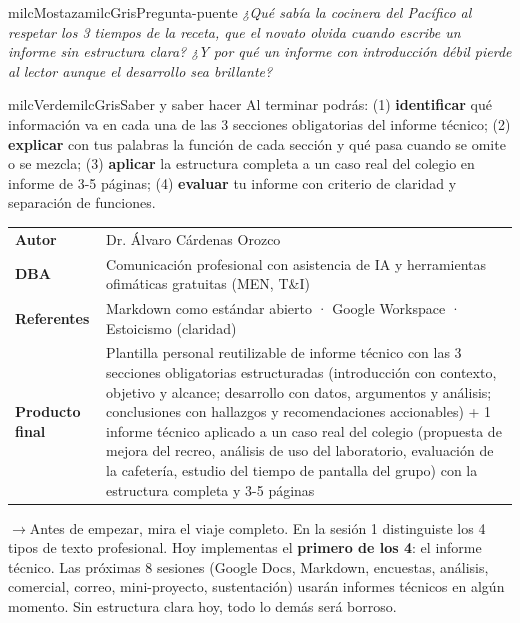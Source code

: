 \documentclass[11pt,letterpaper]{article}
\newcommand{\puente}[1]{%
  \begin{puentebox}%
    \textcolor{milcGradeDark}{$\rightarrow$}\hspace{2mm}#1%
  \end{puentebox}%
}
\begin{document}
\begin{softbox}{milcMostaza}{milcGris}{Pregunta-puente}
\textit{¿Qué sabía la cocinera del Pacífico al respetar los 3 tiempos de la receta, que el novato olvida cuando escribe un informe sin estructura clara? ¿Y por qué un informe con introducción débil pierde al lector aunque el desarrollo sea brillante?}
\end{softbox}

\begin{softbox}{milcVerde}{milcGris}{Saber y saber hacer}
Al terminar podrás: (1) \textbf{identificar} qué información va en cada una de las 3 secciones obligatorias del informe técnico; (2) \textbf{explicar} con tus palabras la función de cada sección y qué pasa cuando se omite o se mezcla; (3) \textbf{aplicar} la estructura completa a un caso real del colegio en informe de 3-5 páginas; (4) \textbf{evaluar} tu informe con criterio de claridad y separación de funciones.
\end{softbox}



\small
\begin{tabularx}{\textwidth}{>{\bfseries}p{3.0cm}Y}
Autor & Dr. Álvaro Cárdenas Orozco\\
DBA & Comunicación profesional con asistencia de IA y herramientas ofimáticas gratuitas (MEN, T\&I)\\
Referentes & Markdown como estándar abierto · Google Workspace · Estoicismo (claridad)\\
Producto final & Plantilla personal reutilizable de informe técnico con las 3 secciones obligatorias estructuradas (introducción con contexto, objetivo y alcance; desarrollo con datos, argumentos y análisis; conclusiones con hallazgos y recomendaciones accionables) + 1 informe técnico aplicado a un caso real del colegio (propuesta de mejora del recreo, análisis de uso del laboratorio, evaluación de la cafetería, estudio del tiempo de pantalla del grupo) con la estructura completa y 3-5 páginas\\
\end{tabularx}
\normalsize

\puente{Antes de empezar, mira el viaje completo. En la sesión 1 distinguiste los 4 tipos de texto profesional. Hoy implementas el \textbf{primero de los 4}: el informe técnico. Las próximas 8 sesiones (Google Docs, Markdown, encuestas, análisis, comercial, correo, mini-proyecto, sustentación) usarán informes técnicos en algún momento. Sin estructura clara hoy, todo lo demás será borroso.}
\end{document}
